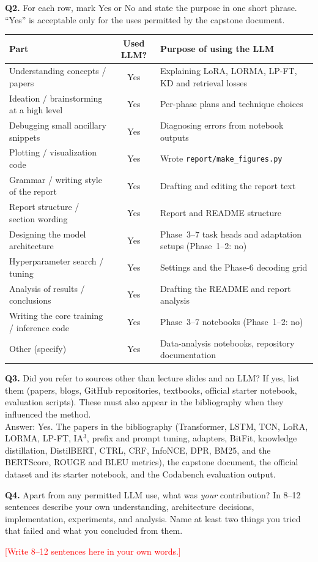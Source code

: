 \documentclass[11pt, oneside]{article}
\newcommand{\todo}[1]{\textcolor{red}{#1}}
\begin{document}
\noindent
\textbf{Q2.} For each row, mark Yes or No and state the purpose in one short phrase. ``Yes'' is acceptable only for the uses permitted by the capstone document.
\begin{table}[H]
\centering
\begin{tabular}{>{\raggedright\arraybackslash}p{4.6cm}|c|>{\raggedright\arraybackslash}p{7.2cm}}
\toprule
Part & Used LLM? & Purpose of using the LLM \\
\midrule
Understanding concepts / papers & Yes & Explaining LoRA, LORMA, LP-FT, KD and retrieval losses \\
Ideation / brainstorming at a high level & Yes & Per-phase plans and technique choices \\
Debugging small ancillary snippets & Yes & Diagnosing errors from notebook outputs \\
Plotting / visualization code & Yes & Wrote \texttt{report/make\_figures.py} \\
Grammar / writing style of the report & Yes & Drafting and editing the report text \\
Report structure / section wording & Yes & Report and README structure \\
Designing the model architecture & Yes & Phase~3--7 task heads and adaptation setups (Phase~1--2: no) \\
Hyperparameter search / tuning & Yes & Settings and the Phase-6 decoding grid \\
Analysis of results / conclusions & Yes & Drafting the README and report analysis \\
Writing the core training / inference code & Yes & Phase~3--7 notebooks (Phase~1--2: no) \\
Other (specify) & Yes & Data-analysis notebooks, repository documentation \\
\bottomrule
\end{tabular}
\end{table}
\medskip

\noindent
\textbf{Q3.} Did you refer to sources other than lecture slides and an LLM?
If yes, list them (papers, blogs, GitHub repositories, textbooks, official starter notebook, evaluation scripts). These must also appear in the bibliography when they influenced the method. \\[0.4em]
Answer: Yes. The papers in the bibliography (Transformer, LSTM, TCN, LoRA, LORMA, LP-FT, IA$^3$, prefix and prompt tuning, adapters, BitFit, knowledge distillation, DistilBERT, CTRL, CRF, InfoNCE, DPR, BM25, and the BERTScore, ROUGE and BLEU metrics), the capstone document, the official dataset and its starter notebook, and the Codabench evaluation output.
\medskip

\noindent
\textbf{Q4.} Apart from any permitted LLM use, what was \emph{your} contribution? In 8--12 sentences describe your own understanding, architecture decisions, implementation, experiments, and analysis. Name at least two things you tried that failed and what you concluded from them.
\medskip

\noindent
\todo{[Write 8--12 sentences here in your own words.]}

\vspace{1.4cm}


\end{document}
